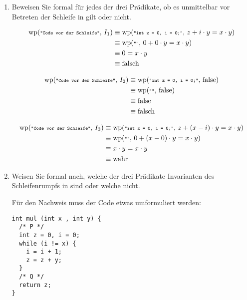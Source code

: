 \documentclass{lehramt-informatik}
\def\wp#1#2{
  \text{wp}(\texttt{\scriptsize"#1"},\thinspace #2)
}
\begin{document}
\begin{enumerate}


\item Beweisen Sie formal für jedes der drei Prädikate, ob es
unmittelbar vor Betreten der Schleife in  gilt oder nicht.

\begin{antwort}
\begin{align*}
\wp{Code vor der Schleife}{I_1}
& \equiv \wp{int z = 0, i = 0;}{z + i \cdot y = x \cdot y} \\
& \equiv \wp{}{0 + 0 \cdot y = x \cdot y} \\
& \equiv 0 = x \cdot y \\
& \equiv \text{falsch} \\
\end{align*}

\begin{align*}
\wp{Code vor der Schleife}{I_2}
& \equiv \wp{int z = 0, i = 0;}{\text{false}} \\
& \equiv \wp{}{\text{false}} \\
& \equiv \text{false} \\
& \equiv \text{falsch} \\
\end{align*}

\begin{align*}
\wp{Code vor der Schleife}{I_3}
& \equiv \wp{int z = 0, i = 0;}{z + (x - i) \cdot y = x \cdot y} \\
& \equiv \wp{}{0 + (x - 0) \cdot y = x \cdot y} \\
& \equiv x \cdot y = x \cdot y \\
& \equiv \text{wahr} \\
\end{align*}
\end{antwort}


\item Weisen Sie formal nach, welche der drei Prädikate Invarianten des
Schleifenrumpfs in  sind oder welche nicht.

\begin{antwort}
Für den Nachweis muss der Code etwas umformuliert werden:

\begin{verbatim}
int mul (int x , int y) {
  /* P */
  int z = 0, i = 0;
  while (i != x) {
    i = i + 1;
    z = z + y;
  }
  /* Q */
  return z;
}
\end{verbatim}


\end{antwort}
\end{enumerate}
\end{document}
